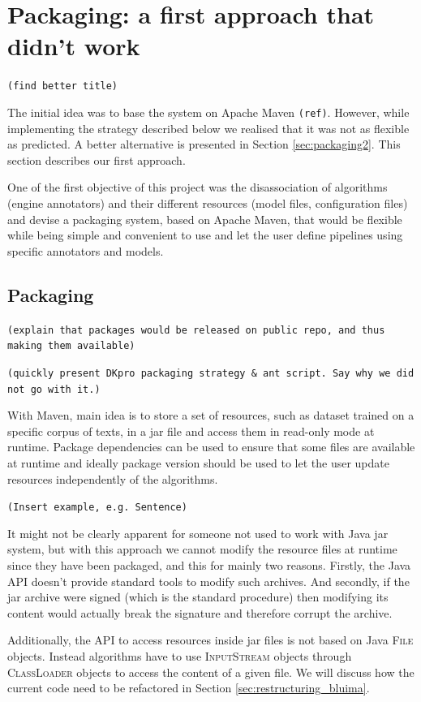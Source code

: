 \documentclass{article}
\newcommand{\ID}[1]{\mbox{\textsc{#1}}}
\newcommand{\TODO}[1]{\texttt{\textcolor{YellowOrange}{(#1)}}} %
\begin{document}
\section{Packaging: a first approach that didn't work}
\label{sec:packaging1}

\TODO{find better title}

The initial idea was to base the system on Apache Maven \TODO{ref}. However, while implementing the strategy described below we realised that it was not as flexible as predicted. A better alternative is presented in Section \ref{sec:packaging2}. This section describes our first approach.

One of the first objective of this project was the disassociation of algorithms (engine annotators) and their different resources (model files, configuration files) and devise a packaging system, based on Apache Maven, that would be flexible while being simple and convenient to use and let the user define pipelines using specific annotators and models.

\subsection{Packaging}

\TODO{explain that packages would be released on public repo, and thus making them available}

\TODO{quickly present DKpro packaging strategy \& ant script. Say why we did not go with it.}

With Maven, main idea is to store a set of resources, such as dataset trained on a specific corpus of texts, in a jar file and access them in read-only mode at runtime. Package dependencies can be used to ensure that some files are available at runtime and ideally package version should be used to let the user update resources independently of the algorithms.

\TODO{Insert example, e.g. Sentence}

It might not be clearly apparent for someone not used to work with Java jar system, but with this approach we cannot modify the resource files at runtime since they have been packaged, and this for mainly two reasons. Firstly, the Java API doesn't provide standard tools to modify such archives. And secondly, if the jar archive were signed (which is the standard procedure) then modifying its content would actually break the signature and therefore corrupt the archive.

Additionally, the API to access resources inside jar files is not based on Java \ID{File} objects. Instead algorithms have to use \ID{InputStream} objects through \ID{ClassLoader} objects to access the content of a given file. We will discuss how the current code need to be refactored in Section \ref{sec:restructuring_bluima}.
\end{document}
